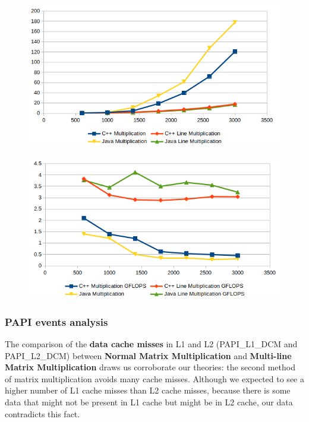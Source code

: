 \begin{figure}[H]
    \begin{minipage}{.5\textwidth}
        \centering
        \includegraphics[width=\linewidth]{img/small_execution_time.png}
        \label{fig:test1}
    \end{minipage}
    \begin{minipage}{.5\textwidth}
        \centering
        \includegraphics[width=\linewidth]{img/small_flops.png}
        \label{fig:test1}
    \end{minipage}%
\end{figure}

\subsubsection{PAPI events analysis}

The comparison of the \textbf{data cache misses} in L1 and L2 (PAPI\_L1\_DCM and PAPI\_L2\_DCM) between \textbf{Normal Matrix Multiplication} and \textbf{Multi-line Matrix Multiplication} draws us corroborate our theories: the second method of matrix multiplication avoids many cache misses. Although we expected to see a higher number of L1 cache misses than L2 cache misses, because there is some data that might not be present in L1 cache but might be in L2 cache, our data contradicts this fact.

